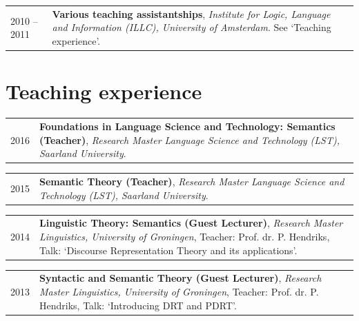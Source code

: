 \documentclass[a4paper,10pt]{article}
\def\leftcolwidth{.12\textwidth}
\def\tablevspace{10pt}
\begin{document}
\noindent
\begin{tabularx}{\textwidth}{ p{\leftcolwidth} X }
  2010 -- 2011
  & \textbf{Various teaching assistantships}, \textit{Institute for Logic,
      Language and Information (ILLC), University of Amsterdam}. See
      `Teaching experience'.\\
\end{tabularx}


\section*{Teaching experience}


\noindent
\begin{tabularx}{\textwidth}{ p{\leftcolwidth} X }
  2016
  & \textbf{Foundations in Language Science and Technology: Semantics (Teacher)},
  \textit{Research Master Language
  Science and Technology (LST), Saarland University}.\\
\end{tabularx}

\vspace{\tablevspace}

\noindent
\begin{tabularx}{\textwidth}{ p{\leftcolwidth} X }
  2015
  & \textbf{Semantic Theory (Teacher)}, \textit{Research Master Language
  Science and Technology (LST), Saarland University}.\\
\end{tabularx}

\vspace{\tablevspace}

\noindent
\begin{tabularx}{\textwidth}{ p{\leftcolwidth} X }
  2014
  & \textbf{Linguistic Theory: Semantics (Guest Lecturer)}, 
    \textit{Research Master Linguistics, University of Groningen},
    Teacher: Prof. dr. P. Hendriks,
    Talk: `Discourse Representation Theory and its applications'.
\end{tabularx}

\vspace{\tablevspace}

\noindent
\begin{tabularx}{\textwidth}{ p{\leftcolwidth} X }
  2013
  & \textbf{Syntactic and Semantic Theory (Guest Lecturer)},
    \textit{Research Master Linguistics, University of Groningen},
    Teacher: Prof. dr. P. Hendriks,
    Talk: `Introducing DRT and PDRT'.
\end{tabularx}
\end{document}

